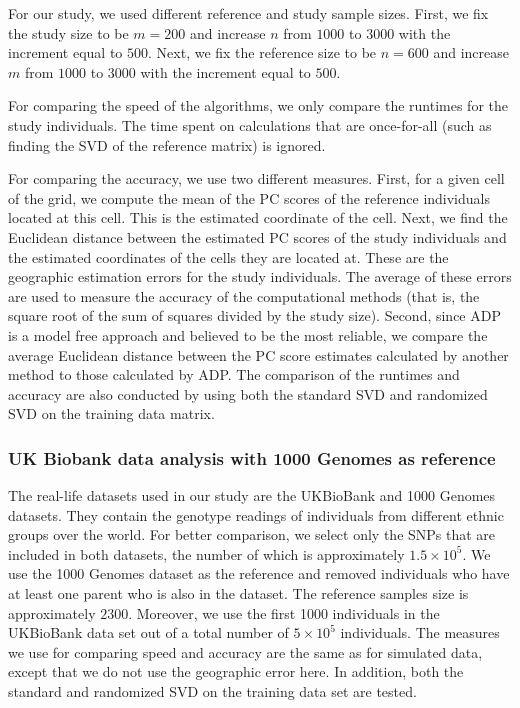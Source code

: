\documentclass{article}
\begin{document}
For our study, we used different reference and study sample sizes.
First, we fix
the study size to be $m=200$ and increase $n$ from $1000$ to $3000$ with the
increment equal to $500$.
Next, we fix
the reference size to be $n=600$ and increase $m$ from $1000$ to $3000$ with the increment equal to $500$.

For comparing the speed of the algorithms,
we only compare the runtimes for the study individuals.
The time spent on calculations that are once-for-all (such as finding the SVD of
the reference matrix) is ignored.

For comparing the accuracy, we use two different measures.
First, for a given cell of the grid, we compute the mean of the PC scores of the 
reference individuals located at this cell.  
This is the estimated coordinate of the cell.
Next, we find the Euclidean distance between the estimated PC scores of the
study individuals and the estimated coordinates of the cells they are located
at.
These are the geographic estimation errors for the study individuals.
The average of these errors are used to measure the accuracy of the
computational methods (that is, the square root of the sum of squares divided by the
study size). 
Second, since ADP is a model free approach and believed to be the most reliable, we compare the average
Euclidean distance between the PC score estimates calculated by another method
to those calculated by ADP. 
The comparison of the runtimes and accuracy are also conducted by using both the
standard SVD and randomized SVD on the training data matrix.

\subsubsection{UK Biobank data analysis with 1000 Genomes as reference}

The real-life datasets used in our study are the UKBioBank and 1000 Genomes datasets.
They contain the genotype readings of individuals from different ethnic groups over the world.
For better comparison, we select only the SNPs that are included in both datasets,
the number of which is approximately $1.5 \times 10^5$.
We use the 1000 Genomes dataset as the reference and removed individuals who have at least one parent who is also in the dataset.
The reference samples size is approximately $2300$.
Moreover, we use the first 1000 individuals in the UKBioBank data set out of a
total number of $5 \times 10^5$ individuals. 
The measures we use for comparing speed and accuracy are the same as for
simulated data,
except that we do not use the geographic error here.
In addition, both the standard and randomized SVD on the training data set are tested.
\end{document}
